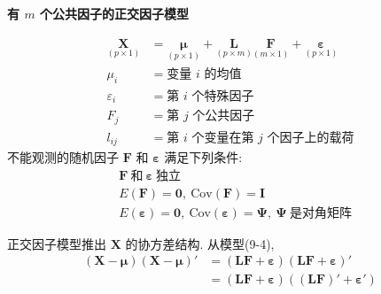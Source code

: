 \begin{mvbox}
\begin{center}
\textbf{有 $m$ 个公共因子的正交因子模型}
\end{center}
\label{eq:9-4}
\begin{equation}
\begin{aligned}
\underset{(p\times1)}{\mathbf{X}}&=\underset{(p\times1)}{\boldsymbol{\mu}}+\underset{(p\times m)}{\mathbf{L}}\underset{(m\times1)}{\mathbf{F}}+\underset{(p\times1)}{\boldsymbol{\varepsilon}}\\
\mu_i&=\text{变量 } i \text{ 的均值}\\
\varepsilon_i&=\text{第 } i \text{ 个特殊因子}\\
F_j&=\text{第 } j \text{ 个公共因子}\\
l_{ij}&=\text{第 } i \text{ 个变量在第 } j \text{ 个因子上的载荷}
\end{aligned}
\tag{9-4}
\end{equation}
不能观测的随机因子 $\mathbf{F}$ 和 $\boldsymbol{\varepsilon}$ 满足下列条件:
\[
\begin{aligned}
&\mathbf{F}\ \text{和}\ \boldsymbol{\varepsilon}\ \text{独立}\\
&E(\mathbf{F})=\mathbf{0},\ \mathrm{Cov}(\mathbf{F})=\mathbf{I}\\
&E(\boldsymbol{\varepsilon})=\mathbf{0},\ \mathrm{Cov}(\boldsymbol{\varepsilon})=\boldsymbol{\Psi},\ \boldsymbol{\Psi}\ \text{是对角矩阵}
\end{aligned}
\]
\end{mvbox}

正交因子模型推出 $\mathbf{X}$ 的协方差结构. 从模型(9-4),
\[
\begin{aligned}
(\mathbf{X}-\boldsymbol{\mu})(\mathbf{X}-\boldsymbol{\mu})'&=(\mathbf{L}\mathbf{F}+\boldsymbol{\varepsilon})(\mathbf{L}\mathbf{F}+\boldsymbol{\varepsilon})'\\
&=(\mathbf{L}\mathbf{F}+\boldsymbol{\varepsilon})((\mathbf{L}\mathbf{F})'+\boldsymbol{\varepsilon}')
\end{aligned}
\]
